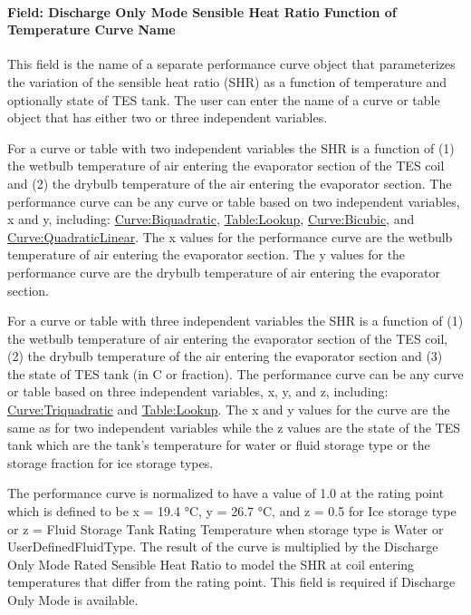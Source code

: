 \paragraph{Field: Discharge Only Mode Sensible Heat Ratio Function of Temperature Curve Name}\label{field-discharge-only-mode-sensible-heat-ratio-function-of-temperature-curve-name}

This field is the name of a separate performance curve object that parameterizes the variation of the sensible heat ratio (SHR) as a function of temperature and optionally state of TES tank. The user can enter the name of a curve or table object that has either two or three independent variables.

For a curve or table with two independent variables the SHR is a function of (1) the wetbulb temperature of air entering the evaporator section of the TES coil and (2) the drybulb temperature of the air entering the evaporator section. The performance curve can be any curve or table based on two independent variables, x and y, including: \hyperref[curvebiquadratic]{Curve:Biquadratic}, \hyperref[tablelookup]{Table:Lookup}, \hyperref[curvebicubic]{Curve:Bicubic}, and \hyperref[curvequadraticlinear]{Curve:QuadraticLinear}. The x values for the performance curve are the wetbulb temperature of air entering the evaporator section. The y values for the performance curve are the drybulb temperature of air entering the evaporator section.

For a curve or table with three independent variables the SHR is a function of (1) the wetbulb temperature of air entering the evaporator section of the TES coil, (2) the drybulb temperature of the air entering the evaporator section and (3) the state of TES tank (in C or fraction). The performance curve can be any curve or table based on three independent variables, x, y, and z, including: \hyperref[curvetriquadratic]{Curve:Triquadratic} and \hyperref[tablelookup]{Table:Lookup}. The x and y values for the curve are the same as for two independent variables while the z values are the state of the TES tank which are the tank's temperature for water or fluid storage type or the storage fraction for ice storage types.

The performance curve is normalized to have a value of 1.0 at the rating point which is defined to be x = 19.4 °C, y = 26.7 °C, and z = 0.5 for Ice storage type or z = Fluid Storage Tank Rating Temperature when storage type is Water or UserDefinedFluidType. The result of the curve is multiplied by the Discharge Only Mode Rated Sensible Heat Ratio to model the SHR at coil entering temperatures that differ from the rating point. This field is required if Discharge Only Mode is available.

